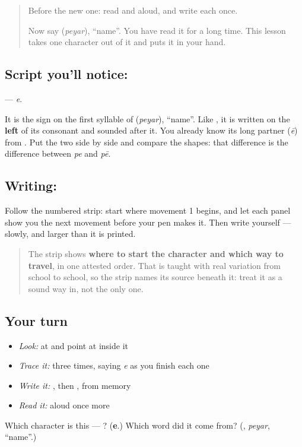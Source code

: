 \label{lesson:TA-S133-vowel-sign-e}



\begin{quote}
Before the new one: read  and  aloud, and write each once.

Now say \textbf{} (\emph{peyar}), \textquotedblleft{}name\textquotedblright{}. You have read it for a long time. This lesson takes one character out of it and puts it in your hand.
\end{quote}

\subsection*{Script you'll notice: }
\textbf{} — \emph{e}.

It is the sign on the first syllable of \textbf{} (\emph{peyar}), \textquotedblleft{}name\textquotedblright{}. Like , it is written on the \textbf{left} of its consonant and sounded after it. You already know its long partner  (\emph{ē}) from . Put the two side by side and compare the shapes: that difference is the difference between \emph{pe} and \emph{pē}.

\subsection*{Writing: }

Follow the numbered strip: start where movement 1 begins, and let each panel show you the next movement before your pen makes it. Then write  yourself — slowly, and larger than it is printed.

\begin{quote}
The strip shows \textbf{where to start the character and which way to travel}, in one attested order. That is taught with real variation from school to school, so the strip names its source beneath it: treat it as a sound way in, not the only one.
\end{quote}

\subsection*{Your turn}
\begin{itemize}
\raggedright
  \item \emph{Look:} at \textbf{} and point at  inside it
  \item \emph{Trace it:}  three times, saying \emph{e} as you finish each one
  \item \emph{Write it:} , then , from memory
  \item \emph{Read it:} \textbf{} aloud once more
\end{itemize}

\begin{tcolorbox}[breakable,colback=teal!4,colframe=teal!35!black,title={Before you move on}]
Which character is this — ? (\textbf{e}.) Which word did it come from? (\textbf{}, \emph{peyar}, \textquotedblleft{}name\textquotedblright{}.)
\end{tcolorbox}
